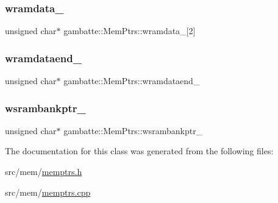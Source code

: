 \subsubsection{\texorpdfstring{wramdata\+\_\+}{wramdata\_}}
{\footnotesize\ttfamily unsigned char$\ast$ gambatte\+::\+Mem\+Ptrs\+::wramdata\+\_\+\mbox{[}2\mbox{]}\hspace{0.3cm}{\ttfamily [private]}}

\mbox{\label{classgambatte_1_1MemPtrs_a81f51d77dc7a063783d7c6365d327471}} 
\subsubsection{\texorpdfstring{wramdataend\+\_\+}{wramdataend\_}}
{\footnotesize\ttfamily unsigned char$\ast$ gambatte\+::\+Mem\+Ptrs\+::wramdataend\+\_\+\hspace{0.3cm}{\ttfamily [private]}}

\mbox{\label{classgambatte_1_1MemPtrs_a12336067daec4b180c396003a8b74645}} 
\subsubsection{\texorpdfstring{wsrambankptr\+\_\+}{wsrambankptr\_}}
{\footnotesize\ttfamily unsigned char$\ast$ gambatte\+::\+Mem\+Ptrs\+::wsrambankptr\+\_\+\hspace{0.3cm}{\ttfamily [private]}}



The documentation for this class was generated from the following files\+:\begin{DoxyCompactItemize}
\item 
src/mem/\hyperlink{memptrs_8h}{memptrs.\+h}\item 
src/mem/\hyperlink{memptrs_8cpp}{memptrs.\+cpp}\end{DoxyCompactItemize}
